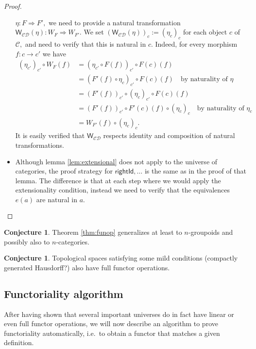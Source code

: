 \documentclass[a4paper]{article}
\theoremstyle{definition}
\newtheorem{conjecture}[definition]{Conjecture}
\theoremstyle{remark}
\newcommand{\C}{\mathcal{C}}
\newcommand{\D}{\mathcal{D}}
\newcommand{\nm}{\mathsf}
\newcommand{\combinator}{\nm}
\newcommand{\dupFun}{\combinator{W}}
\begin{document}
\begin{proof}
\begin{itemize}
    $\eta : F \Rightarrow F',$ we need to provide a natural transformation
    $\dupFun_{\C\D}(\eta) : W_F \Rightarrow W_{F'}.$ We set
    $(\dupFun_{\C\D}(\eta))_c := (\eta_c)_c$ for each object $c$ of $\C,$
    and need to verify that this is natural in $c.$ Indeed, for every
    morphism $f : c \to c'$ we have
    \begin{align*}
      (\eta_{c'})_{c'} \circ W_F(f) &= (\eta_{c'} \circ F(f))_{c'} \circ F(c)(f)\\
                                    &= (F'(f) \circ \eta_c)_{c'} \circ F(c)(f) \quad \text{by naturality of $\eta$}\\
                                    &= (F'(f))_{c'} \circ (\eta_c)_{c'} \circ F(c)(f)\\
                                    &= (F'(f))_{c'} \circ F'(c)(f) \circ (\eta_c)_c \quad \text{by naturality of $\eta_c$}\\
                                    &= W_{F'}(f) \circ (\eta_c)_c.
    \end{align*}
    It is easily verified that $\dupFun_{\C\D}$ respects identity and
    composition of natural transformations.
    \item Although lemma \ref{lem:extensional} does not apply to the universe of
    categories, the proof strategy for $\nm{rightId},\ldots$ is the same
    as in the proof of that lemma. The difference is that at each step where we
    would apply the extensionality condition, instead we need to verify that the
    equivalences $e(a)$ are natural in $a.$ \qedhere
  \end{itemize}
\end{proof}

\begin{conjecture}
  Theorem \ref{thm:funop} generalizes at least to $n$-groupoids and possibly
  also to $n$-categories.
\end{conjecture}

\begin{conjecture}
  Topological spaces satisfying some mild conditions (compactly generated Hausdorff?)
  also have full functor operations.
\end{conjecture}

\subsection{Functoriality algorithm}

After having shown that several important universes do in fact have linear or even full
functor operations, we will now describe an algorithm to prove functoriality
automatically, i.e.\ to obtain a functor that matches a given definition.
\end{document}
